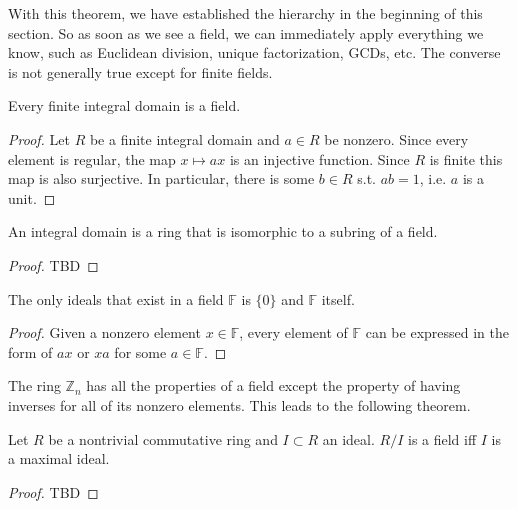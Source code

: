   With this theorem, we have established the hierarchy in the beginning of this section. So as soon as we see a field, we can immediately apply everything we know, such as Euclidean division, unique factorization, GCDs, etc. The converse is not generally true except for finite fields. 

  \begin{theorem}
    Every finite integral domain is a field. 
  \end{theorem} 
  \begin{proof}
    Let $R$ be a finite integral domain and $a \in R$ be nonzero. Since every element is regular, the map $x \mapsto ax$ is an injective function. Since $R$ is finite this map is also surjective. In particular, there is some $b \in R$ s.t. $ab = 1$, i.e. $a$ is a unit. 
  \end{proof}

  \begin{theorem}
    An integral domain is a ring that is isomorphic to a subring of a field. 
  \end{theorem}
  \begin{proof}
    TBD
  \end{proof}

  \begin{theorem}
    The only ideals that exist in a field $\mathbb{F}$ is $\{0\}$ and $\mathbb{F}$ itself. 
  \end{theorem}
  \begin{proof}
    Given a nonzero element $x \in \mathbb{F}$, every element of $\mathbb{F}$ can be expressed in the form of $a x$ or $x a$ for some $a \in \mathbb{F}$. 
  \end{proof}

  The ring $\mathbb{Z}_n$ has all the properties of a field except the property of having inverses for all of its nonzero elements. This leads to the following theorem. 

  \begin{theorem}
    \label{thm:quotient_ring_fields}
    Let $R$ be a nontrivial commutative ring and $I \subset R$ an ideal. $R/I$ is a field iff $I$ is a maximal ideal. 
  \end{theorem}
  \begin{proof}
    TBD
  \end{proof}

